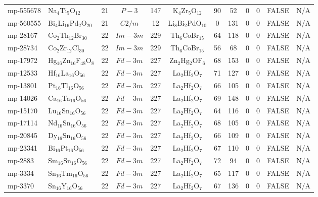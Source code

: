 {\begin{longtable}{llcccccccccc}
    mp-555678 & Na$_{4}$Ti$_{5}$O$_{12}$ & 21    & $P-3$ & 147   & K$_{4}$Zr$_{5}$O$_{12}$ & 90    & 52    & 0     & 0     & FALSE & N/A \\
    mp-560555 & Bi$_{4}$Li$_{16}$Pd$_{2}$O$_{20}$ & 21    & $C2/m$ & 12    & Li$_{8}$Bi$_{2}$PdO$_{10}$ & 0     & 131   & 0     & 0     & FALSE & N/A \\
    mp-28167 & Co$_{2}$Th$_{12}$Br$_{30}$ & 22    & $Im-3m$ & 229   & Th$_{6}$CoBr$_{15}$ & 64    & 118   & 0     & 0     & FALSE & N/A \\
    mp-28734 & Co$_{2}$Zr$_{12}$Cl$_{30}$ & 22    & $Im-3m$ & 229   & Th$_{6}$CoBr$_{15}$ & 56    & 68    & 0     & 0     & FALSE & N/A \\
    mp-17972 & Hg$_{16}$Zn$_{16}$F$_{48}$O$_{8}$ & 22    & $Fd-3m$ & 227   & Zn$_{2}$Hg$_{2}$OF$_{6}$ & 68    & 153   & 0     & 0     & FALSE & N/A \\
    mp-12533 & Hf$_{16}$La$_{16}$O$_{56}$ & 22    & $Fd-3m$ & 227   & La$_{2}$Hf$_{2}$O$_{7}$ & 71    & 127   & 0     & 0     & FALSE & N/A \\
    mp-13801 & Pt$_{16}$Tl$_{16}$O$_{56}$ & 22    & $Fd-3m$ & 227   & La$_{2}$Hf$_{2}$O$_{7}$ & 66    & 105   & 0     & 0     & FALSE & N/A \\
    mp-14026 & Ca$_{16}$Ta$_{16}$O$_{56}$ & 22    & $Fd-3m$ & 227   & La$_{2}$Hf$_{2}$O$_{7}$ & 69    & 148   & 0     & 0     & FALSE & N/A \\
    mp-15170 & Lu$_{16}$Sn$_{16}$O$_{56}$ & 22    & $Fd-3m$ & 227   & La$_{2}$Hf$_{2}$O$_{7}$ & 64    & 116   & 0     & 0     & FALSE & N/A \\
    mp-17114 & Nd$_{16}$Sn$_{16}$O$_{56}$ & 22    & $Fd-3m$ & 227   & La$_{2}$Hf$_{2}$O$_{7}$ & 68    & 105   & 0     & 0     & FALSE & N/A \\
    mp-20845 & Dy$_{16}$Sn$_{16}$O$_{56}$ & 22    & $Fd-3m$ & 227   & La$_{2}$Hf$_{2}$O$_{7}$ & 66    & 109   & 0     & 0     & FALSE & N/A \\
    mp-23341 & Bi$_{16}$Pt$_{16}$O$_{56}$ & 22    & $Fd-3m$ & 227   & La$_{2}$Hf$_{2}$O$_{7}$ & 67    & 110   & 0     & 0     & FALSE & N/A \\
    mp-2883 & Sm$_{16}$Sn$_{16}$O$_{56}$ & 22    & $Fd-3m$ & 227   & La$_{2}$Hf$_{2}$O$_{7}$ & 72    & 94    & 0     & 0     & FALSE & N/A \\
    mp-3334 & Sn$_{16}$Tm$_{16}$O$_{56}$ & 22    & $Fd-3m$ & 227   & La$_{2}$Hf$_{2}$O$_{7}$ & 65    & 117   & 0     & 0     & FALSE & N/A \\
    mp-3370 & Sn$_{16}$Y$_{16}$O$_{56}$ & 22    & $Fd-3m$ & 227   & La$_{2}$Hf$_{2}$O$_{7}$ & 67    & 136   & 0     & 0     & FALSE & N/A \\

\end{longtable}}
